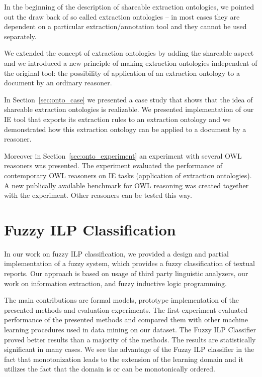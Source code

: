 In the beginning of the description of shareable extraction ontologies, we pointed out the draw back of so called extraction ontologies -- in most cases they are dependent on a particular extraction/annotation tool and they cannot be used separately.	

We extended the concept of extraction ontologies by adding the shareable aspect and we introduced a new principle of making extraction ontologies independent of the original tool: the possibility of application of an extraction ontology to a document by an ordinary reasoner.

In Section~\ref{sec:onto_case} we presented a case study that shows that the idea of shareable extraction ontologies is realizable. We presented implementation of our IE tool that exports its extraction rules to an extraction ontology and we demonstrated how this extraction ontology can be applied to a document by a reasoner.

Moreover in Section~\ref{sec:onto_experiment} an experiment with several OWL reasoners was presented. The experiment evaluated the performance of contemporary OWL reasoners on IE tasks (application of extraction ontologies). A new publically available benchmark for OWL reasoning was created together with the experiment. Other reasoners can be tested this way.




\section{Fuzzy ILP Classification} \label{sec:conclusion}


In our work on fuzzy ILP classification, we provided a design and partial implementation of a fuzzy system, which provides a fuzzy classification of textual reports. Our approach is based on usage of third party linguistic analyzers, our work on information extraction, and fuzzy inductive logic programming.

The main contributions are formal models, prototype implementation of the presented methods and evaluation experiments. The first experiment evaluated performance of the presented methods and compared them with other machine learning procedures used in data mining on our dataset. The Fuzzy ILP Classifier proved better results than a majority of the methods. The results are statistically significant in many cases. 
We see the advantage of the Fuzzy ILP classifier in the fact that monotonization leads to the extension of the learning domain and it utilizes the fact that the domain is or can be monotonically ordered.

